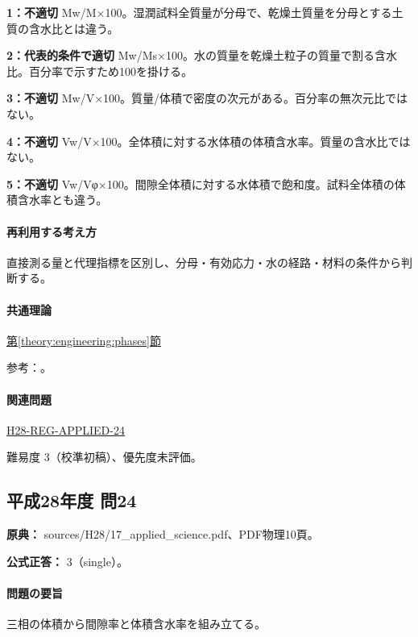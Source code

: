 \noindent\textbf{1：不適切} Mw/M×100。湿潤試料全質量が分母で、乾燥土質量を分母とする土質の含水比とは違う。\par

\noindent\textbf{2：代表的条件で適切} Mw/Ms×100。水の質量を乾燥土粒子の質量で割る含水比。百分率で示すため100を掛ける。\par

\noindent\textbf{3：不適切} Mw/V×100。質量/体積で密度の次元がある。百分率の無次元比ではない。\par

\noindent\textbf{4：不適切} Vw/V×100。全体積に対する水体積の体積含水率。質量の含水比ではない。\par

\noindent\textbf{5：不適切} Vw/Vφ×100。間隙全体積に対する水体積で飽和度。試料全体積の体積含水率とも違う。\par

\paragraph{再利用する考え方} 直接測る量と代理指標を区別し、分母・有効応力・水の経路・材料の条件から判断する。

\paragraph{共通理論} \hyperref[theory:engineering:phases]{第\ref*{theory:engineering:phases}節}

\par 参考：\cite{eng52_soil_phases}。

\paragraph{関連問題} \hyperref[q:h28-reg-applied-24]{H28-REG-APPLIED-24}

\par 難易度 3（校準初稿）、優先度未評価。

\subsection{平成28年度 問24}
\label{q:h28-reg-applied-24}

\noindent\textbf{原典：} sources/H28/17\_applied\_science.pdf、PDF物理10頁。

\textbf{公式正答：} 3（single）。

\paragraph{問題の要旨} 三相の体積から間隙率と体積含水率を組み立てる。


